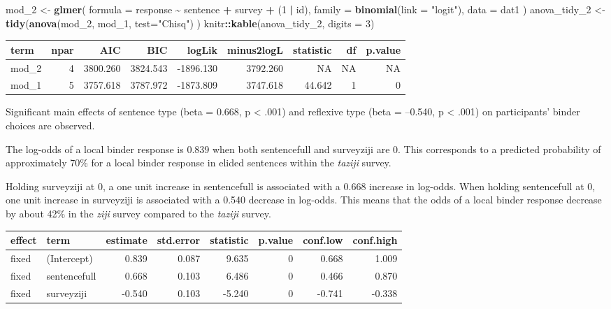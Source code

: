 \documentclass[
  man]{apa6}
\newenvironment{Shaded}{\begin{snugshade}}{\end{snugshade}}
\newcommand{\AttributeTok}[1]{\textcolor[rgb]{0.13,0.29,0.53}{#1}}
\newcommand{\DecValTok}[1]{\textcolor[rgb]{0.00,0.00,0.81}{#1}}
\newcommand{\FunctionTok}[1]{\textcolor[rgb]{0.13,0.29,0.53}{\textbf{#1}}}
\newcommand{\NormalTok}[1]{#1}
\newcommand{\OtherTok}[1]{\textcolor[rgb]{0.56,0.35,0.01}{#1}}
\newcommand{\SpecialCharTok}[1]{\textcolor[rgb]{0.81,0.36,0.00}{\textbf{#1}}}
\newcommand{\StringTok}[1]{\textcolor[rgb]{0.31,0.60,0.02}{#1}}
\begin{document}
\begin{Shaded}
\begin{Highlighting}[]
\NormalTok{mod\_2 }\OtherTok{\textless{}{-}} \FunctionTok{glmer}\NormalTok{(}
  \AttributeTok{formula =}\NormalTok{ response }\SpecialCharTok{\textasciitilde{}}\NormalTok{ sentence }\SpecialCharTok{+}\NormalTok{ survey }\SpecialCharTok{+}\NormalTok{ (}\DecValTok{1} \SpecialCharTok{|}\NormalTok{ id),}
  \AttributeTok{family =} \FunctionTok{binomial}\NormalTok{(}\AttributeTok{link =} \StringTok{"logit"}\NormalTok{),}
  \AttributeTok{data =}\NormalTok{ dat1}
\NormalTok{  )}
\NormalTok{anova\_tidy\_2 }\OtherTok{\textless{}{-}} \FunctionTok{tidy}\NormalTok{(}\FunctionTok{anova}\NormalTok{(mod\_2, mod\_1, }
                         \AttributeTok{test=}\StringTok{"Chisq"}\NormalTok{)}
\NormalTok{                   )}
\NormalTok{knitr}\SpecialCharTok{::}\FunctionTok{kable}\NormalTok{(anova\_tidy\_2, }\AttributeTok{digits =} \DecValTok{3}\NormalTok{)}
\end{Highlighting}
\end{Shaded}

\begin{tabular}{l|r|r|r|r|r|r|r|r}
\hline
term & npar & AIC & BIC & logLik & minus2logL & statistic & df & p.value\\
\hline
mod\_2 & 4 & 3800.260 & 3824.543 & -1896.130 & 3792.260 & NA & NA & NA\\
\hline
mod\_1 & 5 & 3757.618 & 3787.972 & -1873.809 & 3747.618 & 44.642 & 1 & 0\\
\hline
\end{tabular}

Significant main effects of sentence type (beta = 0.668, p \textless{} .001) and reflexive type (beta = --0.540, p \textless{} .001) on participants' binder choices are observed.

The log-odds of a local binder response is 0.839 when both sentencefull and surveyziji are 0. This corresponds to a predicted probability of approximately 70\% for a local binder response in elided sentences within the \emph{taziji} survey.

Holding surveyziji at 0, a one unit increase in sentencefull is associated with a 0.668 increase in log-odds. When holding sentencefull at 0, one unit increase in surveyziji is associated with a 0.540 decrease in log-odds. This means that the odds of a local binder response decrease by about 42\% in the \emph{ziji} survey compared to the \emph{taziji} survey.

\begin{tabular}{l|l|r|r|r|r|r|r}
\hline
effect & term & estimate & std.error & statistic & p.value & conf.low & conf.high\\
\hline
fixed & (Intercept) & 0.839 & 0.087 & 9.635 & 0 & 0.668 & 1.009\\
\hline
fixed & sentencefull & 0.668 & 0.103 & 6.486 & 0 & 0.466 & 0.870\\
\hline
fixed & surveyziji & -0.540 & 0.103 & -5.240 & 0 & -0.741 & -0.338\\
\hline
\end{tabular}
\end{document}

